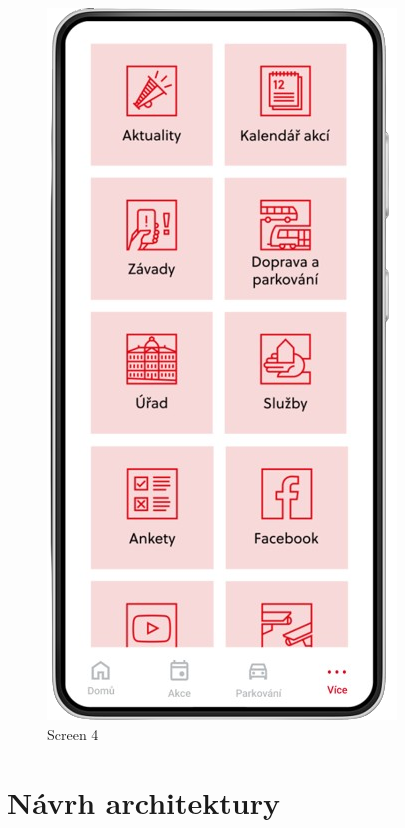 \begin{figure}[H]
    \includegraphics[width=\linewidth]{screen4.png}
    \caption{Screen 4}\label{fig:screen4}
  \endminipage\hfill
\end{figure}

\section{Návrh architektury}

